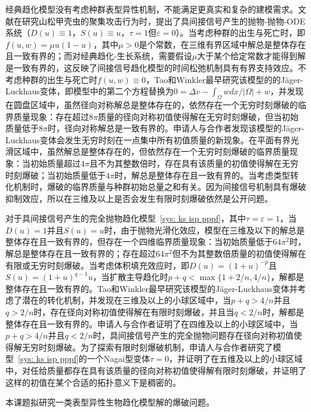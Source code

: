 \documentclass[12pt]{article}
\begin{document}
经典趋化模型没有考虑种群表型异性机制，不能满足更真实和复杂的建模需求。文献在研究山松甲壳虫的聚集攻击行为时，提出了具间接信号产生的抛物-抛物-ODE系统（$D(u)\equiv1$，$S(u)\equiv u$，$\tau=1$但$\varepsilon=0$）。当考虑种群的出生与死亡时，即$f(u,w)=\mu u(1-u)$，其中$\mu>0$是个常数，在三维有界区域中解总是整体存在且一致有界的；而对经典趋化-生长系统，需要假设$\mu$大于某个给定常数才能得到解是一致有界的，这反映了间接信号趋化模型的时间松弛机制具有有界支持效应。不考虑种群的出生与死亡时$f(u,w)\equiv0$，Tao和Winkler最早研究该模型的的J\"ager-Luckhaus变体，即模型中的第二个方程替换为$0 = \Delta v  - \int_\Omega w dx/|\Omega| + w$，并发现在圆盘区域中，虽然径向对称解总是整体存在的，依然存在一个无穷时刻爆破的临界质量现象：存在超过$8\pi$质量的径向对称初值使得解在无穷时刻爆破，但当初始质量低于$8\pi$时，径向对称解总是一致有界的。申请人与合作者发现该模型的J\"ager-Luckhaus变体会发生无穷时刻在一点集中所有初值质量的新现象。在平面有界光滑区域中，虽然解总是整体存在的，但依然存在一个无穷时刻爆破的临界质量现象：当初始质量超过$4\pi$且不为其整数倍时，存在具有该质量的初值使得解在无穷时刻爆破；当初始质量低于$4\pi$时，解总是整体存在且一致有界的。当考虑类型转化机制时，爆破的临界质量与种群初始总量之和有关。因为间接信号机制具有爆破抑制效应，所以在三维及以上是否会发生有限时刻爆破依然是公开问题。

对于具间接信号产生的完全抛物趋化模型~\eqref{sys: ks isp pppf}，其中$\tau=\varepsilon=1$，当$D(u)=1$并且$S(u)=u$时，由于抛物光滑化效应，模型在三维及以下的解总是整体存在且一致有界的，但存在一个四维临界质量现象：当初始质量低于$64\pi^2$时，解总是整体存在且一致有界的；存在超过$64\pi^2$但不为其整数倍质量的初值使得解在有限或无穷时刻爆破。当考虑体积填充效应时，即$D(u)=(1+u)^{-p}$且$S(u)=(1+u)^{q-1}u$，当扩散主导趋化时$p+q<\max\{1+2/n,4/n\}$，解都是整体存在且一致有界的。Tao和Winkler最早研究该模型的J\"ager-Luckhaus变体并考虑了潜在的转化机制，并发现在三维及以上的小球区域中，当$p+q>4/n$并且$q>2/n$时，存在径向对称初值使得解在有限时刻爆破，并且当$q<2/n$时，解都是整体存在且一致有界的。申请人与合作者证明了在四维及以上的小球区域中，当$p+q>4/n$并且$q<2/n$时，具间接信号产生的完全抛物问题存在径向对称初值使得解无穷时刻爆破。为了探索有限时刻爆破机制，申请人与合作者研究了模型~\eqref{sys: ks isp pppf}的一个Nagai型变体$\tau=0$，并证明了在五维及以上的小球区域中，对任给质量都存在具有该质量的径向对称初值使得解有限时刻爆破，并证明了这样的初值在某个合适的拓扑意义下是稠密的。


本课题拟研究一类表型异性生物趋化模型解的爆破问题。
\end{document}
